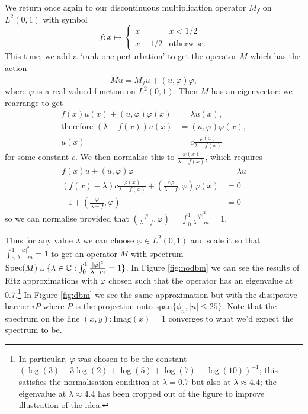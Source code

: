 \documentclass[../main.tex]{subfiles}
\begin{document}
\begin{example} 
  We return once again to our discontinuous multiplication
  operator $M_f$ on $L^2(0, 1)$ with symbol 
    $$
    f: x \mapsto 
    \begin{cases}
      x & x < 1/2\\
      x+1/2 & \text{otherwise}.
    \end{cases} 
    $$
  This time, we add a `rank-one perturbation' to get the operator 
  $\tilde{M}$ which has the action 
    $$\tilde{M}u = M_fu + (u, \varphi) \varphi,$$
  where $\varphi$ is a real-valued function on $L^2(0, 1)$.
  Then $\tilde{M}$ has an eigenvector: we rearrange to get
  \begin{align*} 
    f(x)u(x) + (u, \varphi)\varphi(x) & = \lambda u(x),\\
    \text{therefore }(\lambda - f(x))u(x) & = (u, \varphi)\varphi(x),\\
    u(x) & = c \frac{\varphi(x)}{\lambda - f(x)}
  \end{align*} 
  for some constant $c$. We then normalise this to
  $\frac{\varphi(x)}{\lambda - f(x)}$, which requires 
  \begin{align*}
    f(x)u + (u, \varphi)\varphi & = \lambda u \\
    (f(x) - \lambda)c\frac{\varphi(x)}{\lambda - f(x)} +
    (\frac{c\varphi}{\lambda - f}, \varphi)\varphi(x) & = 0 \\ -1 +
    (\frac{\varphi}{\lambda - f}, \varphi) & = 0 
  \end{align*}
  so we can normalise provided that
  $(\frac{\varphi}{\lambda - f}, \varphi) 
  = \int_0^1 \frac{|\varphi|^2}{\lambda - m} = 1.$
\end{example}

Thus for any value $\lambda$ we can choose $\varphi \in L^2(0, 1)$ and scale it
so that $\int_0^1 \frac{|\varphi|^2}{\lambda - m} = 1$ to get an operator
$\tilde{M}$ with spectrum $\mathrm{Spec}(M) \cup \{\lambda \in \mathbb{C} : \int_0^1
\frac{|\varphi|^2}{\lambda - m} = 1\}$. In Figure \ref{fig:nodbm} we can see the
results of Ritz approximations with $\varphi$ chosen such that the operator has
an eigenvalue at 0.7.\footnote{In particular, $\varphi$ was chosen to be the
constant $(\log(3) - 3\log(2) + \log(5) + \log(7) - \log(10))^{-1}$; this
satisfies the normalisation condition at $\lambda = 0.7$ but also at $\lambda
\approx 4.4$; the eigenvalue at $\lambda \approx 4.4$ has been cropped out of
the figure to improve illustration of the idea.} In Figure \ref{fig:dbm} we see
the same approximation but with the dissipative barrier $iP$ where $P$ is the
projection onto $\mathrm{span}\{\phi_n, |n| \leq 25\}$. Note that the spectrum
on the line ${(x, y) : \mathrm{Imag}(x) = 1}$ converges to what we'd expect the
spectrum to be.
\end{document}
